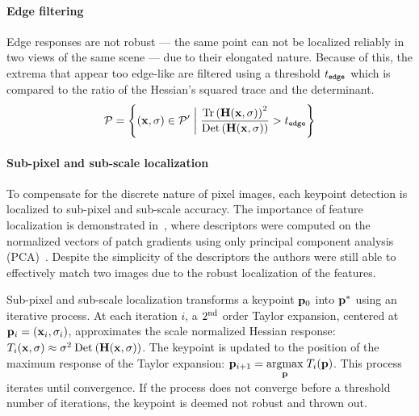        \paragraph{Edge filtering}
            Edge responses are not robust --- \ie{} the same point can not be localized reliably in two views of the
            same scene --- due to their elongated nature. Because of this, the extrema that appear too edge-like
            are filtered using a threshold $t_{\tt{edge}}$ which is compared to the ratio of the Hessian's squared
            trace and the determinant.
            \begin{equation}
                \mathcal{P} = \left\{(\mathbf{x}, \sigma) \in \mathcal{P}' \;\bigg|\; \frac{\mathbin{\textrm{Tr}}\left(\mathbf{H}(\mathbf{x}, \sigma)\right)^2}{\mathbin{\textrm{Det}}\left(\mathbf{H}(\mathbf{x}, \sigma)\right)} > t_{\tt{edge}}\right\}
            \end{equation}

        \paragraph{Sub-pixel and sub-scale localization}
            To compensate for the discrete nature of pixel images, each keypoint detection is localized to
            sub-pixel and sub-scale accuracy. The importance of feature localization is demonstrated
            in~\cite{ke_pca_sift_2004}, where descriptors were computed on the normalized vectors of patch
            gradients using only principal component analysis (PCA)~\cite{jolliffe_principal_1986}. Despite the
            simplicity of the descriptors the authors were still able to effectively match two images due to the
            robust localization of the features.

            Sub-pixel and sub-scale localization transforms a keypoint $\mathbf{p}_0$ into $\mathbf{p}^*$ using an iterative
            process. At each iteration $i$, a $2^{\textrm{nd}}{}$ order Taylor expansion, centered at %
            $\mathbf{p}_i = (\mathbf{x}_i, \sigma_i)$, approximates the scale normalized Hessian response: %
            $T_i(\mathbf{x}, \sigma) \approx \sigma^2 \mathbin{\textrm{Det}}\left(\mathbf{H}(\mathbf{x}, \sigma)\right)$. The keypoint is updated to the position of the
            maximum response of the Taylor expansion: $\mathbf{p}_{i + 1} = \underset{\mathbf{p}}{\operatorname{argmax}}\; T_i(\mathbf{p})$. This process iterates
            until convergence. If the process does not converge before a threshold number of iterations, the
            keypoint is deemed not robust and thrown out.

